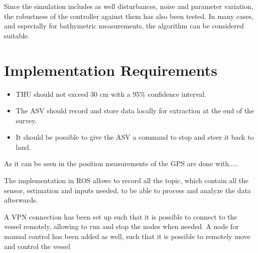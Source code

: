Since the simulation includes as well disturbances, noise and parameter variation, the robustness of the controller against them has also been tested. In many cases, and especially for bathymetric measurements, the algorithm can be considered suitable.


\section{Implementation Requirements}
\begin{itemize}
    \item THU should not exceed 30 cm with a 95\% confidence interval.
    \item The ASV should record and store data locally for extraction at the end of the survey.
    \item It should be possible to give the ASV a command to stop and steer it back to land.
\end{itemize}

As it can be seen in  the position measurements of the GPS are done with.....

The implementation in ROS allows to record all the topic, which contain all the sensor, estimation and inputs needed, to be able to process and analyze the data afterwards.

A VPN connection has been set up such that it is possible to connect to the vessel remotely, allowing to run and stop the nodes when needed. A node for manual control has been added as well, such that it is possible to remotely move and control the vessel


